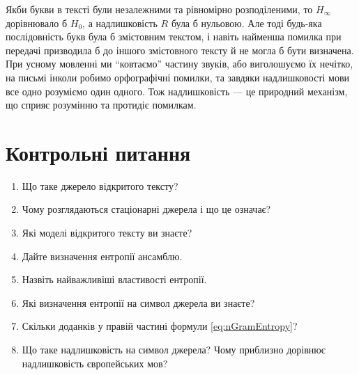 Якби букви в тексті були незалежними та рівномірно розподіленими, то 
$H_\infty$ дорівнювало б $H_0$, а надлишковість $R$ була
б нульовою. Але тоді будь-яка послідовність букв була б змістовним текстом, і
навіть найменша помилка при передачі  призводила б до іншого змістовного тексту
й не могла б бути визначена. При усному мовленні ми “ковтаємо” частину звуків,
або виголошуємо їх нечітко, на письмі інколи робимо орфографічні помилки, та
завдяки надлишковості мови все одно розуміємо один одного. Тож надлишковість ---
це природний механізм, що сприяє розумінню та протидіє помилкам.

\section{Контрольні питання}

\begin{enumerate}
\item Що таке джерело відкритого тексту?
\item Чому розглядаються стаціонарні джерела і що це означає?
\item Які моделі відкритого тексту ви знаєте?
\item Дайте визначення ентропії ансамблю.
\item Назвіть найважливіші властивості ентропії.
\item Які визначення ентропії на символ джерела ви знаєте?
\item Скільки доданків у правій частині формули \eqref{eq:nGramEntropy}?
\item Що таке надлишковість на символ джерела? Чому приблизно дорівнює
    надлишковість європейських мов?
\end{enumerate}

